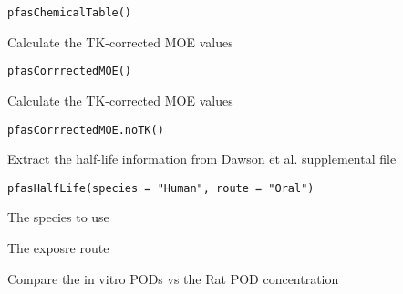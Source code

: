 \documentclass[letterpaper]{book}
\begin{document}
%
\begin{Usage}
\begin{verbatim}
pfasChemicalTable()
\end{verbatim}
\end{Usage}
%
\begin{Description}\relax
Calculate the TK-corrected MOE values
\end{Description}
%
\begin{Usage}
\begin{verbatim}
pfasCorrrectedMOE()
\end{verbatim}
\end{Usage}
%
\begin{Description}\relax
Calculate the TK-corrected MOE values
\end{Description}
%
\begin{Usage}
\begin{verbatim}
pfasCorrrectedMOE.noTK()
\end{verbatim}
\end{Usage}
%
\begin{Description}\relax
Extract the half-life information from Dawson et al. supplemental file
\end{Description}
%
\begin{Usage}
\begin{verbatim}
pfasHalfLife(species = "Human", route = "Oral")
\end{verbatim}
\end{Usage}
%
\begin{Arguments}
\begin{ldescription}
\item[\code{species}] The species to use

\item[\code{route}] The exposre route
\end{ldescription}
\end{Arguments}
%
\begin{Description}\relax
Compare the in vitro PODs vs the Rat POD concentration
\end{Description}
\end{document}
